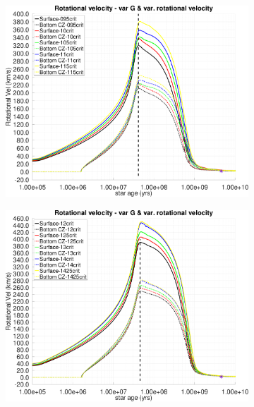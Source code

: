 \documentclass[fleqn,usenatbib]{mnras}
\begin{document}
\begin{ceqn}
\begin{figure}
    \centering
    \begin{subfigure}[h]{0.47\textwidth}
    \includegraphics[clip,width=\textwidth]{figures/paper2/rot_vel_var_vel_var_g1.pdf}
    \label{fig:subim21}
    \end{subfigure}
    \begin{subfigure}[h]{0.47\textwidth}
    \includegraphics[clip,width=\textwidth]{figures/paper2/rot_vel_var_vel_var_g3.pdf}
    \label{fig:subim22}
    \end{subfigure}
    \begin{subfigure}[h]{0.47\textwidth}

\end{subfigure}
\end{figure}
\end{ceqn}
\end{document}
